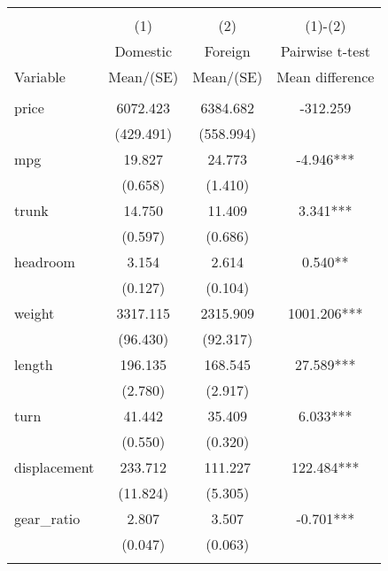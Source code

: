 
\begin{tabular}{@{\extracolsep{5pt}}lccc}
\\[-1.8ex]\hline \hline \\[-1.8ex]
 & \multicolumn{1}{c}{(1)}  & \multicolumn{1}{c}{(2)}  & \multicolumn{1}{c}{(1)-(2)} \\
 & \multicolumn{1}{c}{Domestic}  & \multicolumn{1}{c}{Foreign}  & \multicolumn{1}{c}{Pairwise t-test}  \\
Variable & Mean/(SE) & Mean/(SE) & Mean difference \\ \hline \\[-1.8ex] 
price   & 6072.423    & 6384.682    & -312.259   \\
 & (429.491)  & (558.994)  &  \\ [1ex]
mpg   & 19.827    & 24.773    & -4.946***   \\
 & (0.658)  & (1.410)  &  \\ [1ex]
trunk   & 14.750    & 11.409    & 3.341***   \\
 & (0.597)  & (0.686)  &  \\ [1ex]
headroom   & 3.154    & 2.614    & 0.540**   \\
 & (0.127)  & (0.104)  &  \\ [1ex]
weight   & 3317.115    & 2315.909    & 1001.206***   \\
 & (96.430)  & (92.317)  &  \\ [1ex]
length   & 196.135    & 168.545    & 27.589***   \\
 & (2.780)  & (2.917)  &  \\ [1ex]
turn   & 41.442    & 35.409    & 6.033***   \\
 & (0.550)  & (0.320)  &  \\ [1ex]
displacement   & 233.712    & 111.227    & 122.484***   \\
 & (11.824)  & (5.305)  &  \\ [1ex]
gear\_ratio   & 2.807    & 3.507    & -0.701***   \\
 & (0.047)  & (0.063)  &  \\ [1ex]
\hline \\[-1.8ex]

\end{tabular}
